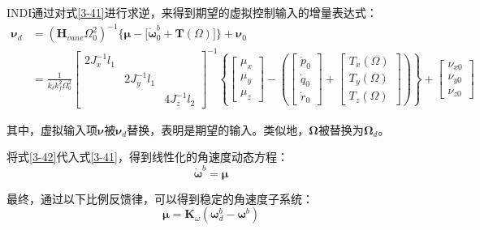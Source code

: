 INDI通过对式\eqref{3-41}进行求逆，来得到期望的虚拟控制输入的增量表达式：
\begin{equation}
    \begin{aligned}
        \boldsymbol{\nu}_d&=(\boldsymbol{H}_{vane}\Omega_0^2)^{-1}\Big\{\boldsymbol{\mu} -\big[\boldsymbol{\dot{\omega}}_0^b+\boldsymbol{T}(\Omega)\big]\Big\}+\boldsymbol{\nu}_0\\
        &=\frac{1}{k_{\delta}k_f^2\Omega_0^2}
        \left[\begin{array}{ccc}2J_x^{-1}l_1 & & \\& 2J_y^{-1}l_1 & \\& & 4J_z^{-1}l_2\end{array}\right]^{-1}
        \left\{\begin{bmatrix}\mu_{x} \\ \mu_{y} \\ \mu_{z}\end{bmatrix}
        -\left (\begin{bmatrix}\dot{p}_0 \\ \dot{q}_0 \\ \dot{r}_0 \end{bmatrix}+\begin{bmatrix}T_{x}(\Omega) \\ T_{y}(\Omega) \\ T_{z}(\Omega)
        \end{bmatrix}\right )\right\}
        +  \begin{bmatrix}\nu_{x0} \\ \nu_{y0} \\ \nu_{z0}\end{bmatrix}
    \end{aligned}
    \label{3-42}
\end{equation}

其中，虚拟输入项$\boldsymbol{\nu}$被$\boldsymbol{\nu}_d$替换，表明是期望的输入。类似地，$\boldsymbol{\Omega}$被替换为$\boldsymbol{\Omega}_d$。

将式\eqref{3-42}代入式\eqref{3-41}，得到线性化的角速度动态方程：
\begin{equation}
    \dot{\boldsymbol \omega}^b=\boldsymbol{\mu}
    \label{3-43}
\end{equation}

最终，通过以下比例反馈律，可以得到稳定的角速度子系统：
\begin{equation}
    \boldsymbol{\mu}=\boldsymbol{K}_{\omega}(\boldsymbol{\omega}_d^b-\boldsymbol{\omega}^b)
    \label{3-44}
\end{equation}

